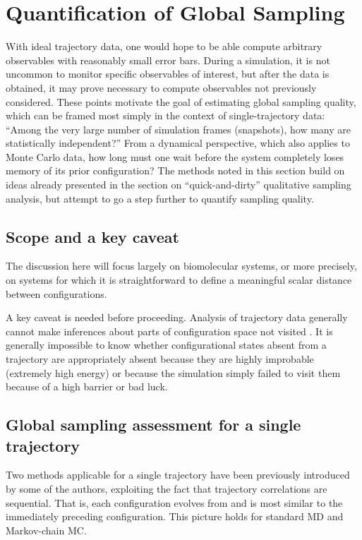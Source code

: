 \section{Quantification of Global Sampling}

With ideal trajectory data, one would hope to be able compute arbitrary observables with reasonably small error bars.
During a simulation, it is not uncommon to monitor specific observables of interest, but after the data is obtained, it may prove necessary to compute observables not previously considered.
These points motivate the goal of estimating global sampling quality, which can be framed most simply in the context of single-trajectory data:
``Among the very large number of simulation frames (snapshots), how many are statistically independent?''  
From a dynamical perspective, which also applies to Monte Carlo data, how long must one wait before the system completely loses memory of its prior configuration?
The methods noted in this section build on ideas already presented in the section on ``quick-and-dirty'' qualitative sampling analysis, but attempt to go a step further to quantify sampling quality.

\subsection{Scope and a key caveat}
The discussion here will focus largely on biomolecular systems, or more precisely, on systems for which it is straightforward to define a meaningful scalar distance between configurations.

A key caveat is needed before proceeding.  
Analysis of trajectory data generally cannot make inferences about parts of configuration space not visited \cite{Grossfield2009}.
It is generally impossible to know whether configurational states absent from a trajectory are appropriately absent because they are highly improbable (extremely high energy) or because the simulation simply failed to visit them because of a high barrier or bad luck.

\subsection{Global sampling assessment for a single trajectory}
Two methods applicable for a single trajectory have been previously introduced by some of the authors, exploiting the fact that trajectory correlations are sequential.
That is, each configuration evolves from and is most similar to the immediately preceding configuration.
This picture holds for standard MD and Markov-chain MC.

